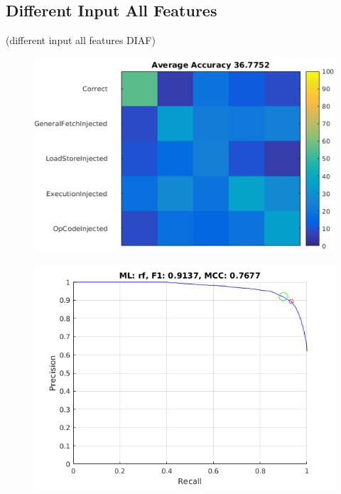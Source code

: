 \documentclass{sig-alternate}
\begin{document}
\subsection{Different Input All Features}
(different input all features DIAF)

\begin{figure}[t]
\begin{center}
   \includegraphics[width=0.95\linewidth]{./figures/diaf_multi.png}
\end{center}
   \caption{}
\label{fig:diaf-multi}
\end{figure}

\begin{figure}[t]
\begin{center}
   \includegraphics[width=0.95\linewidth]{./figures/disf.png}
\end{center}
   \caption{}
\label{fig:disf}
\end{figure}
\end{document}
